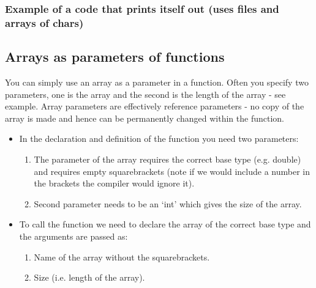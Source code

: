 \subsubsection*{Example of a code that prints itself out (uses files and arrays of chars)}



\subsection{Arrays as parameters of functions}
You can simply use an array as a parameter in a function. Often you specify two parameters, one is the
array and the second is the length of the array - see example. Array parameters are effectively reference
parameters - no copy of the array is made and hence can be permanently changed within the function.

\begin{itemize}
	\item In the declaration and definition of the function you need two parameters:
	\begin{enumerate}
		\item The parameter of the array requires the correct base type (e.g. double)
		and requires empty squarebrackets (note if we would include a number in the brackets the compiler
		would ignore it).
		\item Second parameter needs to be an `int' which gives the size of the array.	
	\end{enumerate}
	
	\item To call the function we need to declare the array of the correct base type and the
	arguments are passed as:
	\begin{enumerate}
		\item Name of the array without the squarebrackets.
		\item Size (i.e. length of the array).
	\end{enumerate}
	
\end{itemize}

